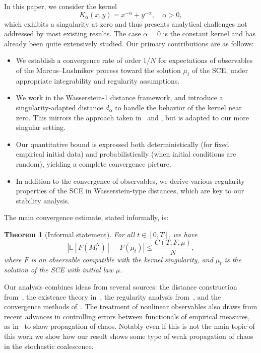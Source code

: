 \documentclass[11pt,a4paper]{article}
\newtheorem{theorem}{Theorem}[section]
\begin{document}
In this paper, we consider the kernel
\[
    K_\alpha(x,y) = x^{-\alpha} + y^{-\alpha}, \quad \alpha > 0,
\]
which exhibits a singularity at zero and thus presents analytical challenges not addressed by most existing results. The case $\alpha = 0$ is the constant kernel and has already been quite extensively studied. Our primary contributions are as follows:

\begin{itemize}
    \item We establish a convergence rate of order $1/N$ for expectations of observables of the Marcus–Lushnikov process toward the solution $\mu_t$ of the SCE, under appropriate integrability and regularity assumptions.
    \item We work in the Wasserstein-1 distance framework, and introduce a singularity-adapted distance $d_\alpha$ to handle the behavior of the kernel near zero. This mirrors the approach taken in~\cite{fournier2015rate} and \cite{cepedaSmoluchowskisEquationRate2011a}, but is adapted to our more singular setting.
    \item Our quantitative bound is expressed both deterministically (for fixed empirical initial data) and probabilistically (when initial conditions are random), yielding a complete convergence picture.
    \item In addition to the convergence of observables, we derive various regularity properties of the SCE in Wasserstein-type distances, which are key to our stability analysis.
\end{itemize}

The main convergence estimate, stated informally, is:
\begin{theorem}[Informal statement]
    For all $t \in [0,T]$, we have
    \[
        \left| \mathbb{E}\left[F\left(M^N_t\right)\right] - F(\mu_t) \right| \leq \frac{C(T, F, \mu)}{N},
    \]
    where $F$ is an observable compatible with the kernel singularity, and $\mu_t$ is the solution of the SCE with initial law $\mu$.
\end{theorem}

Our analysis combines ideas from several sources: the distance construction from~\cite{cepedaSmoluchowskisEquationRate2011a}, the existence theory in~\cite{norrisSmoluchowskisCoagulationEquation1999}, the regularity analysis from~\cite{kolokoltsov2010central}, and the convergence methods of~\cite{kyprianouUniversalityClassFragmentationcoalescence2018,martiniKolmogorovEquationsSpaces2023}. The treatment of nonlinear observables also draws from recent advances in controlling errors between functionals of empirical measures, as in~\cite{delarue2025uniform} to show propagation of chaos. Notably even if this is not the main topic of this work we show how our result shows some type of weak propagation of chaos in the stochastic coalescence.
\end{document}
